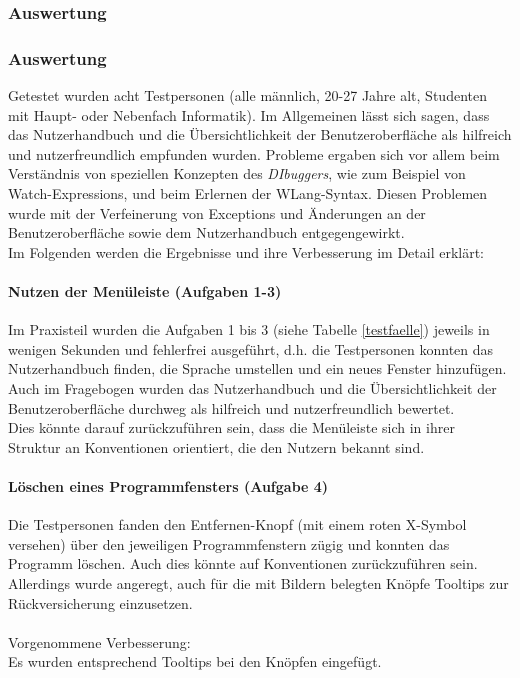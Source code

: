 \documentclass[parskip=full]{scrartcl}
\begin{document}
\subsubsection{Auswertung}

\subsubsection{Auswertung}
Getestet wurden acht Testpersonen (alle männlich, 20-27 Jahre alt, Studenten mit Haupt- oder Nebenfach Informatik).
Im Allgemeinen lässt sich sagen, dass das Nutzerhandbuch und die Übersichtlichkeit der Benutzeroberfläche als hilfreich und nutzerfreundlich empfunden wurden. Probleme ergaben sich vor allem beim Verständnis von speziellen Konzepten des \textit{DIbuggers}, wie zum Beispiel von Watch-Expressions, und beim Erlernen der WLang-Syntax. Diesen Problemen wurde mit der Verfeinerung von Exceptions und Änderungen an der Benutzeroberfläche sowie dem Nutzerhandbuch entgegengewirkt.\\
Im Folgenden werden die Ergebnisse und ihre Verbesserung im Detail erklärt:

\paragraph{Nutzen der Menüleiste (Aufgaben 1-3)}
Im Praxisteil wurden die Aufgaben 1 bis 3 (siehe Tabelle \ref{testfaelle}) jeweils in wenigen Sekunden und fehlerfrei ausgeführt, d.h. die Testpersonen konnten das Nutzerhandbuch finden, die Sprache umstellen und ein neues Fenster hinzufügen.\\
Auch im Fragebogen wurden das Nutzerhandbuch und die Übersichtlichkeit der Benutzeroberfläche durchweg als hilfreich und nutzerfreundlich bewertet.\\
Dies könnte darauf zurückzuführen sein, dass die Menüleiste sich in ihrer Struktur an Konventionen orientiert, die den Nutzern bekannt sind.

\paragraph{Löschen eines Programmfensters (Aufgabe 4)}
Die Testpersonen fanden den Entfernen-Knopf (mit einem roten X-Symbol versehen) über den jeweiligen Programmfenstern zügig und konnten das Programm löschen. Auch dies könnte auf Konventionen zurückzuführen sein. \\Allerdings wurde angeregt, auch für die mit Bildern belegten Knöpfe Tooltips zur Rückversicherung einzusetzen.\\\\
Vorgenommene Verbesserung:\\
Es wurden entsprechend Tooltips bei den Knöpfen eingefügt.
\end{document}
